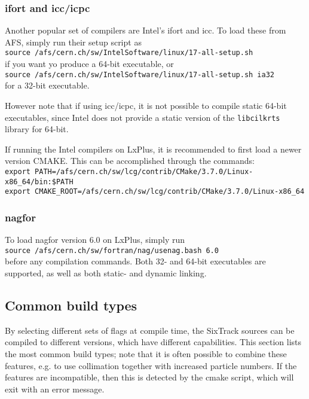 \documentclass[english]{article}
\begin{document}

\subsubsection{ifort and icc/icpc}
Another popular set of compilers are Intel's ifort and icc.
To load these from AFS, simply run their setup script as\\
{\small
  \texttt{source /afs/cern.ch/sw/IntelSoftware/linux/17-all-setup.sh}\\
}
if you want yo produce a 64-bit executable, or\\
{\small
  \texttt{source /afs/cern.ch/sw/IntelSoftware/linux/17-all-setup.sh~ia32}\\
}
for a 32-bit executable.

However note that if using icc/icpc, it is not possible to compile static 64-bit executables, since Intel does not provide a static version of the \texttt{libcilkrts} library for 64-bit.

If running the Intel compilers on LxPlus, it is recommended to first load a newer version CMAKE.
This can be accomplished through the commands:\\
{\scriptsize
  \texttt{export PATH=/afs/cern.ch/sw/lcg/contrib/CMake/3.7.0/Linux-x86\_64/bin:\$PATH}\\
  \texttt{export CMAKE\_ROOT=/afs/cern.ch/sw/lcg/contrib/CMake/3.7.0/Linux-x86\_64}
}

\subsubsection{nagfor}

To load nagfor version 6.0 on LxPlus, simply run\\
\texttt{source /afs/cern.ch/sw/fortran/nag/usenag.bash 6.0}\\
before any compilation commands.
Both 32- and 64-bit executables are supported, as well as both static- and dynamic linking.


\subsection{Common build types}
\label{sec:building:options}
By selecting different sets of flags at compile time, the SixTrack sources can be compiled to different versions, which have different capabilities.
This section lists the most common build types; note that it is often possible to combine these features, e.g. to use collimation together with increased particle numbers.
If the features are incompatible, then this is detected by the cmake script, which will exit with an error message.
\end{document}
